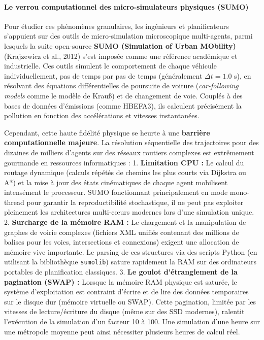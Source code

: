 \documentclass[10pt, a4paper]{article}
\begin{document}
\paragraph{Le verrou computationnel des micro-simulateurs physiques
(SUMO)}\label{le-verrou-computationnel-des-micro-simulateurs-physiques-sumo}

Pour étudier ces phénomènes granulaires, les ingénieurs et
planificateurs s'appuient sur des outils de micro-simulation
microscopique multi-agents, parmi lesquels la suite open-source
\textbf{SUMO (Simulation of Urban MObility)} (Krajzewicz et al., 2012)
s'est imposée comme une référence académique et industrielle. Ces outils
simulent le comportement de chaque véhicule individuellement, pas de
temps par pas de temps (généralement \(\Delta t = 1.0\) s), en résolvant
des équations différentielles de poursuite de voiture
(\emph{car-following models} comme le modèle de Krauß) et de changement
de voie. Couplés à des bases de données d'émissions (comme HBEFA3), ils
calculent précisément la pollution en fonction des accélérations et
vitesses instantanées.

Cependant, cette haute fidélité physique se heurte à une
\textbf{barrière computationnelle majeure}. La résolution séquentielle
des trajectoires pour des dizaines de milliers d'agents sur des réseaux
routiers complexes est extrêmement gourmande en ressources informatiques
: 1. \textbf{Limitation CPU :} Le calcul du routage dynamique (calculs
répétés de chemins les plus courts via Dijkstra ou A*) et la mise à jour
des états cinématiques de chaque agent mobilisent intensément le
processeur. SUMO fonctionnant principalement en mode mono-thread pour
garantir la reproductibilité stochastique, il ne peut pas exploiter
pleinement les architectures multi-cœurs modernes lors d'une simulation
unique. 2. \textbf{Surcharge de la mémoire RAM :} Le chargement et la
manipulation de graphes de voirie complexes (fichiers XML unifiés
contenant des millions de balises pour les voies, intersections et
connexions) exigent une allocation de mémoire vive importante. Le
parsing de ces structures via des scripts Python (en utilisant la
bibliothèque \texttt{sumolib}) sature rapidement la RAM sur des
ordinateurs portables de planification classiques. 3. \textbf{Le goulot
d'étranglement de la pagination (SWAP) :} Lorsque la mémoire RAM
physique est saturée, le système d'exploitation est contraint d'écrire
et de lire des données temporaires sur le disque dur (mémoire virtuelle
ou SWAP). Cette pagination, limitée par les vitesses de lecture/écriture
du disque (même sur des SSD modernes), ralentit l'exécution de la
simulation d'un facteur 10 à 100. Une simulation d'une heure sur une
métropole moyenne peut ainsi nécessiter plusieurs heures de calcul réel.
\end{document}
